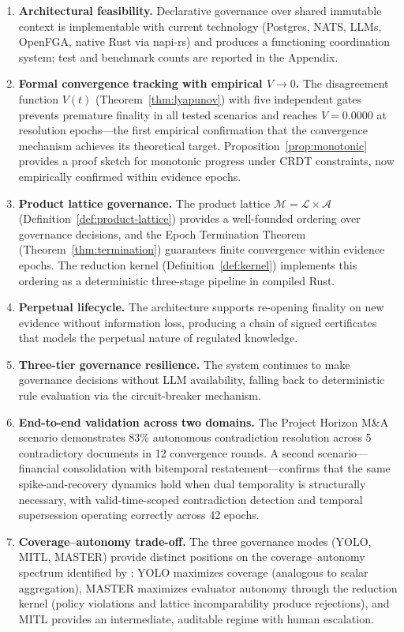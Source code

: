 \documentclass[11pt]{article}
\begin{document}
\begin{enumerate}
  \item \textbf{Architectural feasibility.} Declarative governance over shared immutable context is implementable with current technology (Postgres, NATS, LLMs, OpenFGA, native Rust via napi-rs) and produces a functioning coordination system; test and benchmark counts are reported in the Appendix.
  \item \textbf{Formal convergence tracking with empirical $V \to 0$.} The disagreement function $V(t)$ (Theorem~\ref{thm:lyapunov}) with five independent gates prevents premature finality in all tested scenarios and reaches $V = 0.0000$ at resolution epochs---the first empirical confirmation that the convergence mechanism achieves its theoretical target. Proposition~\ref{prop:monotonic} provides a proof sketch for monotonic progress under CRDT constraints, now empirically confirmed within evidence epochs.
  \item \textbf{Product lattice governance.} The product lattice $\mathcal{M} = \mathcal{L} \times \mathcal{A}$ (Definition~\ref{def:product-lattice}) provides a well-founded ordering over governance decisions, and the Epoch Termination Theorem (Theorem~\ref{thm:termination}) guarantees finite convergence within evidence epochs. The reduction kernel (Definition~\ref{def:kernel}) implements this ordering as a deterministic three-stage pipeline in compiled Rust.
  \item \textbf{Perpetual lifecycle.} The architecture supports re-opening finality on new evidence without information loss, producing a chain of signed certificates that models the perpetual nature of regulated knowledge.
  \item \textbf{Three-tier governance resilience.} The system continues to make governance decisions without LLM availability, falling back to deterministic rule evaluation via the circuit-breaker mechanism.
  \item \textbf{End-to-end validation across two domains.} The Project Horizon M\&A scenario demonstrates 83\% autonomous contradiction resolution across 5 contradictory documents in 12 convergence rounds. A second scenario---financial consolidation with bitemporal restatement---confirms that the same spike-and-recovery dynamics hold when dual temporality is structurally necessary, with valid-time-scoped contradiction detection and temporal supersession operating correctly across 42 epochs.
  \item \textbf{Coverage--autonomy trade-off.} The three governance modes (YOLO, MITL, MASTER) provide distinct positions on the coverage--autonomy spectrum identified by \cite{delachica2026}: YOLO maximizes coverage (analogous to scalar aggregation), MASTER maximizes evaluator autonomy through the reduction kernel (policy violations and lattice incomparability produce rejections), and MITL provides an intermediate, auditable regime with human escalation.
\end{enumerate}
\end{document}
